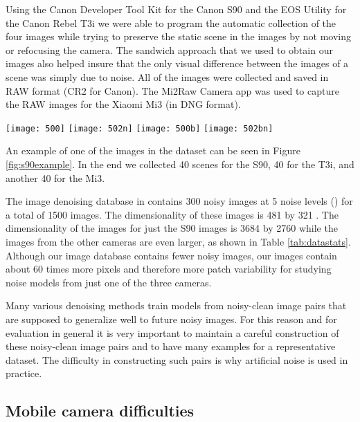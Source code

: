 \documentclass[review]{elsarticle}
\begin{document}
Using the Canon Developer Tool Kit for the Canon S90 and the EOS Utility for the Canon Rebel T3i we were able to program the automatic collection of the four images while trying to preserve the static scene in the images by not moving or refocusing the camera.  The sandwich approach that we used to obtain our images also helped insure that the only visual difference between the images of a scene was simply due to noise.  All of the images were collected and saved in RAW format (CR2 for Canon). The Mi2Raw Camera app was used to capture the RAW images for the Xiaomi Mi3 (in DNG format).
\begin{figure*}[htb]
\centering
\texttt{[image: 500]}
\texttt{[image: 502n]}
\vskip 0.5mm
\texttt{[image: 500b]}
\texttt{[image: 502bn]}
\vskip -3mm
\caption{An example of a clean and noisy image pair as well as their corresponding blue channel. The noise present is the result of the low-light environment. The images were taken using a Canon PowerShot S90. }
\label {fig:s90example}
\vspace{-2mm}
\end{figure*}

An example of one of the images in the dataset can be seen in Figure \ref{fig:s90example}. In the end we collected 40 scenes for the S90, 40 for the T3i, and another 40 for the Mi3.

The image denoising database in \cite{ImageDenoisingBenchmark} contains 300 noisy images at 5 noise levels () for a total of 1500 images. The dimensionality of these images is 481 by 321 . The dimensionality of the images for just the S90 images is 3684 by 2760 while the images from the other cameras are even larger, as shown in Table \ref{tab:datastats}. Although our image database contains fewer noisy images, our images contain about 60 times more pixels and therefore more patch variability for studying noise models from just one of the three cameras.

Many various denoising methods \cite{barbu2009training,NeuralNetworkCompete,optMRF} train models from noisy-clean image pairs that are supposed to generalize well to future noisy images. For this reason and for evaluation in general it is very important to maintain a careful construction of these noisy-clean image pairs and to have many examples for a representative dataset. The difficulty in constructing such pairs is why artificial noise is used in practice.



\subsection{Mobile camera difficulties}
\end{document}

